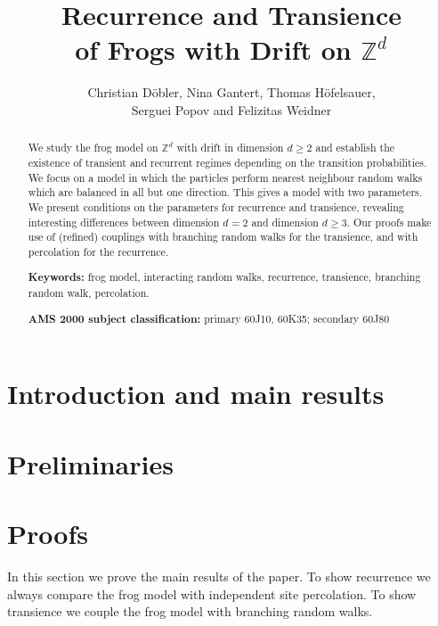 \documentclass[12pt,a4paper]{article}
\theoremstyle{plain}
\newcommand{\Z}{\mathbb{Z}} %
\newcommand{\1}{\mathds{1}} %
\begin{document}
\title{Recurrence and Transience\\ of Frogs with Drift on $\Z^d$}
\author{Christian D\"obler, Nina Gantert, Thomas H\"ofelsauer, \\Serguei Popov and Felizitas Weidner}
\maketitle

\begin{abstract}
We study the frog model on $\Z^d$ with drift in dimension $d \geq 2$ and establish the existence of transient and recurrent regimes depending on the transition probabilities. We focus on a model in which the particles perform nearest neighbour random walks which are balanced in all but one direction. This gives a model with two parameters. We present conditions on the parameters for recurrence and transience, revealing interesting differences between dimension $d=2$ and dimension $d \geq 3$.
Our proofs make use of (refined) couplings with branching random walks for the transience, and with percolation for the recurrence.

\smallskip
\noindent \textbf{Keywords:} frog model, interacting random walks, recurrence, transience, branching random walk, percolation.

\smallskip
\noindent \textbf{AMS 2000 subject classification:} primary 60J10, 60K35; secondary 60J80
\end{abstract}


\section{Introduction and main results}


\section{Preliminaries}\label{preliminaries}


\section{Proofs}\label{proofs}
In this section we prove the main results of the paper. To show recurrence we always compare the frog model with independent site percolation. To show transience we couple the frog model with branching random walks.



\end{document}
